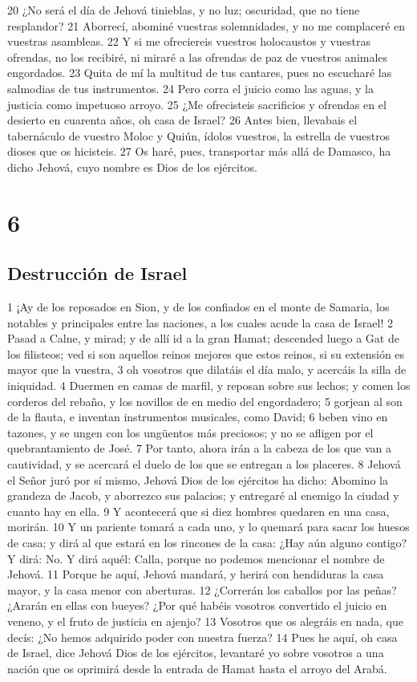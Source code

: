 20 ¿No será el día de Jehová tinieblas, y no luz; oscuridad, que no tiene resplandor?
21 Aborrecí, abominé vuestras solemnidades, y no me complaceré en vuestras asambleas.
22 Y si me ofreciereis vuestros holocaustos y vuestras ofrendas, no los recibiré, ni miraré a las ofrendas de paz de vuestros animales engordados. 
23 Quita de mí la multitud de tus cantares, pues no escucharé las salmodias de tus instrumentos.
24 Pero corra el juicio como las aguas, y la justicia como impetuoso arroyo.
25 ¿Me ofrecisteis sacrificios y ofrendas en el desierto en cuarenta años, oh casa de Israel?
26 Antes bien, llevabais el tabernáculo de vuestro Moloc y Quiún, ídolos vuestros, la estrella de vuestros dioses que os hicisteis.
27 Os haré, pues, transportar más allá de Damasco, ha dicho Jehová, cuyo nombre es Dios de los ejércitos.

\chapter{6}

\section*{Destrucción de Israel}

1 ¡Ay de los reposados en Sion, y de los confiados en el monte de Samaria, los notables y principales entre las naciones, a los cuales acude la casa de Israel!
2 Pasad a Calne, y mirad; y de allí id a la gran Hamat; descended luego a Gat de los filisteos; ved si son aquellos reinos mejores que estos reinos, si su extensión es mayor que la vuestra,
3 oh vosotros que dilatáis el día malo, y acercáis la silla de iniquidad.
4 Duermen en camas de marfil, y reposan sobre sus lechos; y comen los corderos del rebaño, y los novillos de en medio del engordadero;
5 gorjean al son de la flauta, e inventan instrumentos musicales, como David;
6 beben vino en tazones, y se ungen con los ungüentos más preciosos; y no se afligen por el quebrantamiento de José.
7 Por tanto, ahora irán a la cabeza de los que van a cautividad, y se acercará el duelo de los que se entregan a los placeres.
8 Jehová el Señor juró por sí mismo, Jehová Dios de los ejércitos ha dicho: Abomino la grandeza de Jacob, y aborrezco sus palacios; y entregaré al enemigo la ciudad y cuanto hay en ella.
9 Y acontecerá que si diez hombres quedaren en una casa, morirán.
10 Y un pariente tomará a cada uno, y lo quemará para sacar los huesos de casa; y dirá al que estará en los rincones de la casa: ¿Hay aún alguno contigo? Y dirá: No. Y dirá aquél: Calla, porque no podemos mencionar el nombre de Jehová.
11 Porque he aquí, Jehová mandará, y herirá con hendiduras la casa mayor, y la casa menor con aberturas.
12 ¿Correrán los caballos por las peñas? ¿Ararán en ellas con bueyes? ¿Por qué habéis vosotros convertido el juicio en veneno, y el fruto de justicia en ajenjo?
13 Vosotros que os alegráis en nada, que decís: ¿No hemos adquirido poder con nuestra fuerza?
14 Pues he aquí, oh casa de Israel, dice Jehová Dios de los ejércitos, levantaré yo sobre vosotros a una nación que os oprimirá desde la entrada de Hamat hasta el arroyo del Arabá.

